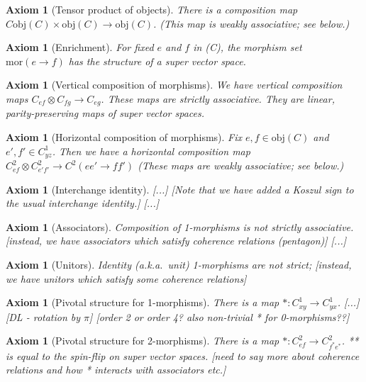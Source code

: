 \documentclass[12pt,a4paper]{article}
\newtheorem{axiom}[theorem]{Axiom}
\newcommand{\mor}{\text{mor}}
\newcommand{\obj}{\text{obj}}
\newcommand{\ot}{\otimes}
\newcommand{\nn}[1]{{\color{kwcolor}[#1]}}
\begin{document}
\begin{axiom}[Tensor product of objects]
There is a composition map $C\obj(C) \times \obj(C) \to \obj(C)$.
(This map is weakly associative; see below.)
\end{axiom}

\begin{axiom}[Enrichment]
For fixed $e$ and $f$ in \obj(C), the morphism set $\mor(e\to f)$ has the structure of a super vector space.
\end{axiom}

\begin{axiom}[Vertical composition of morphisms]
We have vertical composition maps $C_{ef} \ot C_{fg} \to C_{eg}$.
These maps are strictly associative.
They are linear, parity-preserving maps of super vector spaces.
\end{axiom}

\begin{axiom}[Horizontal composition of morphisms]
Fix $e, f \in \obj(C)$ and $e',f'\in C^1_{yz}$.
Then we have a horizontal composition map $C^2_{ef} \ot C^2_{e'f'} \to C^2(ee' \to ff')$
(These maps are weakly associative; see below.)
\end{axiom}

\begin{axiom}[Interchange identity]
\nn{...}
\nn{Note that we have added a Koszul sign to the usual interchange identity.}
\nn{...}
\end{axiom}

\begin{axiom}[Associators]
Composition of 1-morphisms is not strictly associative.
\nn{instead, we have associators which satisfy coherence relations (pentagon)}
\nn{...}\end{axiom}

\begin{axiom}[Unitors]
Identity (a.k.a.\ unit) 1-morphisms are not strict;
\nn{instead, we have unitors which satisfy some coherence relations}
\end{axiom}

\begin{axiom}[Pivotal structure for 1-morphisms]
There is a map $*:C^1_{xy} \to C^1_{yx}$.
\nn{...}
\nn{DL - rotation by $\pi$}
\nn{order 2 or order 4?  also non-trivial * for 0-morphisms??}
\end{axiom}

\begin{axiom}[Pivotal structure for 2-morphisms]
There is a map $*:C^2_{ef} \to C^2_{f^*e^*}$.
** is equal to the spin-flip on super vector spaces.
\nn{need to say more about coherence relations and how * interacts with associators etc.}
\end{axiom}
\end{document}
